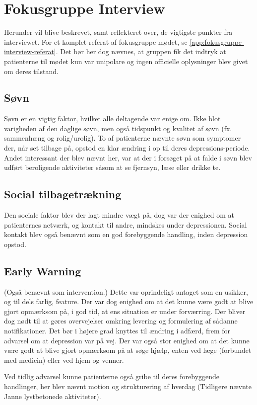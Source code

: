 \section{Fokusgruppe Interview}
Herunder vil blive beskrevet, samt reflekteret over, de vigtigste punkter fra interviewet.
For et komplet referat af fokusgruppe mødet, se \cref{app:fokusgruppe-interview-referat}.
Det bør her dog nævnes, at gruppen fik det indtryk at patienterne til mødet kun var unipolare og ingen officielle oplysninger blev givet om deres tilstand.

\subsection{Søvn}
Søvn er en vigtig faktor, hvilket alle deltagende var enige om.
Ikke blot varigheden af den daglige søvn, men også tidspunkt og kvalitet af søvn (fx. sammenhæng og rolig/urolig).
To af patienterne nævnte søvn som symptomer der, når set tilbage på, opstod en klar ændring i op til deres depressions-periode.
Andet interessant der blev nævnt her, var at der i forsøget på at falde i søvn blev udført beroligende aktiviteter såsom at se fjernsyn, læse eller drikke te.

\subsection{Social tilbagetrækning}
Den sociale faktor blev der lagt mindre vægt på, dog var der enighed om at patienternes netværk, og kontakt til andre, mindskes under depressionen.
Social kontakt blev også benævnt som en god forebyggende handling, inden depression opstod.

\subsection{Early Warning}
(Også benævnt som intervention.)
Dette var oprindeligt antaget som en usikker, og til dels farlig, feature.
Der var dog enighed om at det kunne være godt at blive gjort opmærksom på, i god tid, at ens situation er under forværring.
Der bliver dog nødt til at gøres overvejelser omkring levering og formulering af sådanne notifikationer.
Det bør i højere grad knyttes til ændring i adfærd, frem for advarsel om at depression var på vej.
Der var også stor enighed om at det kunne være godt at blive gjort opmærksom på at søge hjælp, enten ved læge (forbundet med medicin) eller ved hjem og venner.

Ved tidlig advarsel kunne patienterne også gribe til deres forebyggende handlinger, her blev nævnt motion og strukturering af hverdag 
(Tidligere nævnte Janne lystbetonede aktiviteter).

